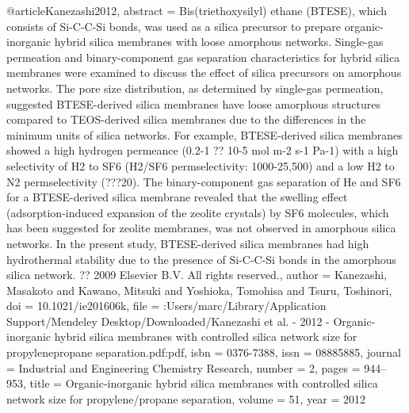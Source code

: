 @article{Kanezashi2012,
abstract = {Bis(triethoxysilyl) ethane (BTESE), which consists of Si-C-C-Si bonds, was used as a silica precursor to prepare organic-inorganic hybrid silica membranes with loose amorphous networks. Single-gas permeation and binary-component gas separation characteristics for hybrid silica membranes were examined to discuss the effect of silica precursors on amorphous networks. The pore size distribution, as determined by single-gas permeation, suggested BTESE-derived silica membranes have loose amorphous structures compared to TEOS-derived silica membranes due to the differences in the minimum units of silica networks. For example, BTESE-derived silica membranes showed a high hydrogen permeance (0.2-1 ?? 10-5 mol m-2 s-1 Pa-1) with a high selectivity of H2 to SF6 (H2/SF6 permselectivity: 1000-25,500) and a low H2 to N2 permselectivity (???20). The binary-component gas separation of He and SF6 for a BTESE-derived silica membrane revealed that the swelling effect (adsorption-induced expansion of the zeolite crystals) by SF6 molecules, which has been suggested for zeolite membranes, was not observed in amorphous silica networks. In the present study, BTESE-derived silica membranes had high hydrothermal stability due to the presence of Si-C-C-Si bonds in the amorphous silica network. ?? 2009 Elsevier B.V. All rights reserved.},
author = {Kanezashi, Masakoto and Kawano, Mitsuki and Yoshioka, Tomohisa and Tsuru, Toshinori},
doi = {10.1021/ie201606k},
file = {:Users/marc/Library/Application Support/Mendeley Desktop/Downloaded/Kanezashi et al. - 2012 - Organic-inorganic hybrid silica membranes with controlled silica network size for propylenepropane separation.pdf:pdf},
isbn = {0376-7388},
issn = {08885885},
journal = {Industrial and Engineering Chemistry Research},
number = {2},
pages = {944--953},
title = {{Organic-inorganic hybrid silica membranes with controlled silica network size for propylene/propane separation}},
volume = {51},
year = {2012}
}
